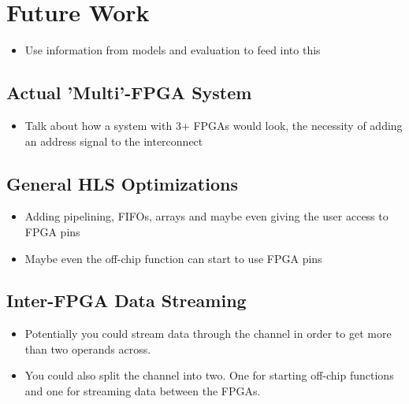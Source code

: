 \chapter{Future Work}

\begin{itemize}
    \item Use information from models and evaluation to feed into this
\end{itemize}

\section{Actual 'Multi'-FPGA System}

\begin{itemize}
    \item Talk about how a system with 3+ FPGAs would look, the necessity of adding an address signal to the interconnect
\end{itemize}

\section{General HLS Optimizations}

\begin{itemize}
    \item Adding pipelining, FIFOs, arrays and maybe even giving the user access to FPGA pins
    \item Maybe even the off-chip function can start to use FPGA pins
\end{itemize}

\section{Inter-FPGA Data Streaming}

\begin{itemize}
    \item Potentially you could stream data through the channel in order to get more than two operands across.
    \item You could also split the channel into two. One for starting off-chip functions and one for streaming data between the FPGAs.
\end{itemize}
